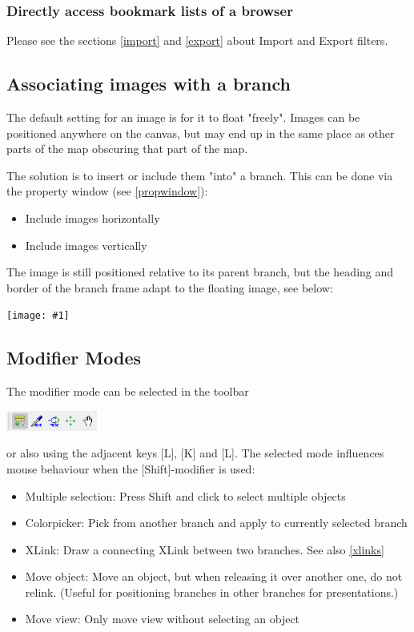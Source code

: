 \documentclass[12pt,a4paper]{article}
\newcommand{\maximage}[1]{  
    \begin{center}
        \texttt{[image: \#1]} 
    \end{center}
}
\newcommand{\key}[1]{[#1]}
\begin{document}
\subsubsection*{Directly access bookmark lists of a browser}
Please see the sections \ref{import} and \ref{export} about
Import and Export filters.

\subsection{Associating images with a branch} \label{incimg}
The default setting for an image is for it to float "freely". Images can
be positioned anywhere on the canvas, but may end up in the same place
as other parts of the map obscuring that part of the map.

The solution is to insert or include them "into" a branch. This can be
done via the property window (see \ref{propwindow}):
\begin{itemize}
    \item Include images horizontally
    \item Include images vertically
\end{itemize}
The image is still positioned relative to its parent branch, but the
heading and border of the branch frame adapt to the floating image, see
below: \maximage{images/includeImages.png}

\subsection{Modifier Modes} 
The modifier mode can be selected in the toolbar
\begin{center}
    \includegraphics[width=3cm]{images/modmodes.png}
\end{center}
or also using the adjacent keys \key{L}, \key{K} and \key{L}.
The selected mode influences mouse behaviour when the \key{Shift}-modifier is
used:
\begin{itemize}
    \item Multiple selection: Press Shift and click to select multiple objects
    \item Colorpicker: Pick from another branch and apply to currently
        selected branch
    \item XLink: Draw a connecting XLink between two branches. See also
        \ref{xlinks}
    \item Move object: Move an object, but when releasing it over another one, do not relink.
        (Useful for positioning branches in other branches for presentations.)
    \item Move view: Only move view without selecting an object
\end{itemize}
\end{document}
